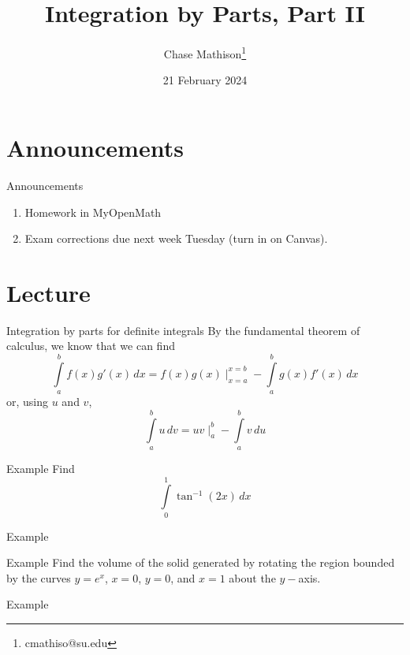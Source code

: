 \documentclass[presentation]{beamer}
\institute[SU]{Shenandoah University}
\author{Chase Mathison\thanks{cmathiso@su.edu}}
\date{21 February 2024}
\title{Integration by Parts, Part II}
\begin{document}
\maketitle
\section{Announcements}
\label{sec:org466afdc}
\begin{frame}[label={sec:orgc5af4d0}]{Announcements}
\begin{enumerate}
\item Homework in MyOpenMath
\item Exam corrections due next week Tuesday (turn in on Canvas).
\end{enumerate}
\end{frame}

\section{Lecture}
\label{sec:org064b9c0}
\begin{frame}[label={sec:orgdc54471}]{Integration by parts for definite integrals}
By the fundamental theorem of calculus, we know that we can find
\[
\int\limits_a^b f \left( x \right)g' \left( x \right)\,dx = f \left( x
\right)g \left( x \right)\mid_{x=a}^{x=b} - \int\limits_a^b g \left( x
\right)f' \left( x \right)\,dx \]
or, using \(u\) and \(v\),
\[
\int\limits_a^b u\,dv = uv \mid_a^b - \int\limits_a^b v\,du \]
\end{frame}

\begin{frame}[label={sec:org3817380}]{Example}
Find
\[\int\limits_0^1 \tan^{-1} \left( 2 x \right)\,dx \]
\vspace{10in}
\end{frame}

\begin{frame}[label={sec:org519ae45}]{Example}
\end{frame}

\begin{frame}[label={sec:orgf1f835c}]{Example}
Find the volume of the solid generated by rotating the region bounded
by the curves \(y = e^x\), \(x = 0\), \(y = 0\), and \(x = 1\)
about the \(y-\)axis.
\vspace{10in}
\end{frame}

\begin{frame}[label={sec:orged1b359}]{Example}
\end{frame}
\end{document}
